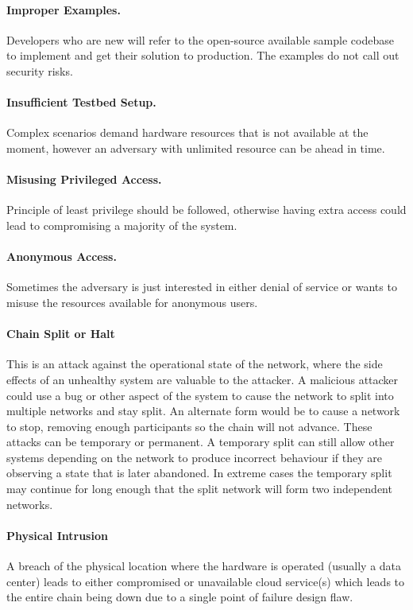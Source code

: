 \paragraph{Improper Examples.} Developers who are new will refer to the open-source available sample codebase to implement and get their solution to production. The examples do not call out security risks.

\paragraph{Insufficient Testbed Setup.} Complex scenarios demand hardware resources that is not available at the moment, however an adversary with unlimited resource can be ahead in time.

\paragraph{Misusing Privileged Access.} Principle of least privilege should be followed, otherwise having extra access could lead to compromising a majority of the system.

\paragraph{Anonymous Access.} Sometimes the adversary is just interested in either denial of service or wants to misuse the resources available for anonymous users.

\paragraph{Chain Split or Halt}  This is an attack against the operational state of the network, where the side effects of an unhealthy system are valuable to the attacker.
A malicious attacker could use a bug or other aspect of the system to cause the network to split into multiple networks and stay split.
An alternate form would be to cause a network to stop, removing enough participants so the chain will not advance.
These attacks can be temporary or permanent.
A temporary split can still allow other systems depending on the network to produce incorrect behaviour if they are observing a state that is later abandoned.
In extreme cases the temporary split may continue for long enough that the split network will form two independent networks.

\paragraph {Physical Intrusion}  A breach of the physical location where the hardware is operated (usually a data center) leads to either compromised or unavailable cloud service(s) which leads to the entire chain being down due to a single point of failure design flaw.
